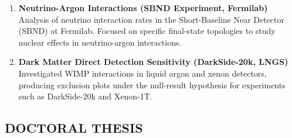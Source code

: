 \documentclass[12pt,a4paper,oneside]{extarticle}
\begin{document}
\begin{enumerate}
    \item \textbf{Neutrino-Argon Interactions (SBND Experiment, Fermilab)}\\
    Analysis of neutrino interaction rates in the Short-Baseline Near Detector (SBND) at Fermilab. Focused on specific final-state topologies to study nuclear effects in neutrino-argon interactions.

    \item \textbf{Dark Matter Direct Detection Sensitivity (DarkSide-20k, LNGS)}\\
    Investigated WIMP interactions in liquid argon and xenon detectors, producing exclusion plots under the null-result hypothesis for experiments such as DarkSide-20k and Xenon-1T.
\end{enumerate}
\subsection*{DOCTORAL THESIS}
\end{document}
